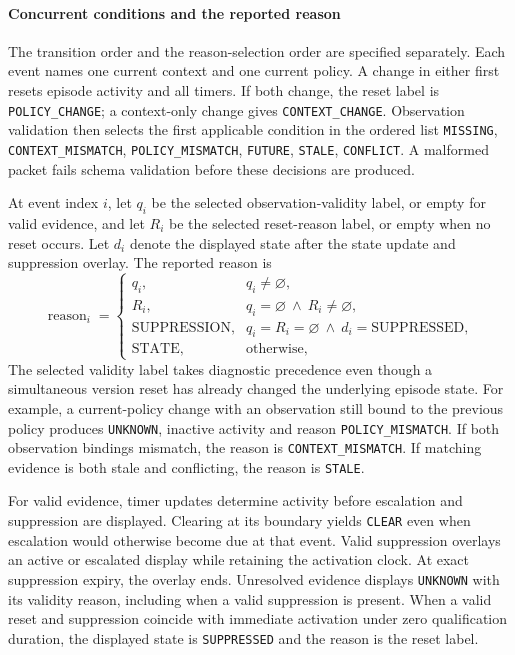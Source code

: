 \documentclass[preprint,11pt]{elsarticle}
\newcommand{\code}[1]{\texttt{#1}}
\begin{document}
\paragraph{Concurrent conditions and the reported reason}
The transition order and the reason-selection order are specified separately. Each event names one current context and one current policy. A change in either first resets episode activity and all timers. If both change, the reset label is \code{POLICY\_CHANGE}; a context-only change gives \code{CONTEXT\_CHANGE}. Observation validation then selects the first applicable condition in the ordered list \code{MISSING}, \code{CONTEXT\_MISMATCH}, \code{POLICY\_MISMATCH}, \code{FUTURE}, \code{STALE}, \code{CONFLICT}. A malformed packet fails schema validation before these decisions are produced.

At event index $i$, let $q_i$ be the selected observation-validity label, or empty for valid evidence, and let $R_i$ be the selected reset-reason label, or empty when no reset occurs. Let $d_i$ denote the displayed state after the state update and suppression overlay. The reported reason is
\begin{equation}
\operatorname{reason}_i=
\begin{cases}
q_i, & q_i\ne\varnothing,\\
R_i, & q_i=\varnothing\ \land\ R_i\ne\varnothing,\\
\text{SUPPRESSION}, & q_i=R_i=\varnothing\ \land\ d_i=\text{SUPPRESSED},\\
\text{STATE}, & \text{otherwise},
\end{cases}
\end{equation}
The selected validity label takes diagnostic precedence even though a simultaneous version reset has already changed the underlying episode state. For example, a current-policy change with an observation still bound to the previous policy produces \code{UNKNOWN}, inactive activity and reason \code{POLICY\_MISMATCH}. If both observation bindings mismatch, the reason is \code{CONTEXT\_MISMATCH}. If matching evidence is both stale and conflicting, the reason is \code{STALE}.

For valid evidence, timer updates determine activity before escalation and suppression are displayed. Clearing at its boundary yields \code{CLEAR} even when escalation would otherwise become due at that event. Valid suppression overlays an active or escalated display while retaining the activation clock. At exact suppression expiry, the overlay ends. Unresolved evidence displays \code{UNKNOWN} with its validity reason, including when a valid suppression is present. When a valid reset and suppression coincide with immediate activation under zero qualification duration, the displayed state is \code{SUPPRESSED} and the reason is the reset label.
\end{document}

